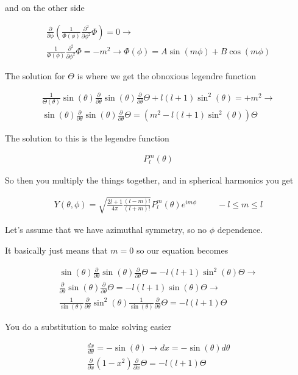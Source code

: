 \documentclass[fleqn]{report}
\newcommand{\hp}{\hspace{1cm}}
\newcommand{\del}{\partial}
\newcommand{\equations} [1] {
\begin{gather*}
#1
\end{gather*}
}
\begin{document}
and on the other side 

\equations{
    \frac{\del}{\del \phi}
    \left(
        \frac{1}{\Phi(\phi)}
        \frac{\del^2}{\del \phi^2}
        \Phi
    \right)
    = 
    0
    \rightarrow 
    \\
    \frac{1}{\Phi(\phi)}
    \frac{\del^2}{\del \phi^2}
    \Phi
    = 
    -m^2
    \rightarrow 
    \Phi(\phi)
    =
    A \sin(m \phi) + B \cos(m \phi)
}

The solution for $\Theta$ is where we get the obnoxious legendre function 

\equations{
    \frac{1}{\Theta(\theta)}
    \sin(\theta)
    \frac{\del}{\del \theta} 
    \sin(\theta) 
    \frac{\del}{\del \theta} 
    \Theta 
    +
    l(l+1) \sin^2(\theta)
    =
    +m^2
    \rightarrow 
    \\
    \sin(\theta)
    \frac{\del}{\del \theta} 
    \sin(\theta) 
    \frac{\del}{\del \theta} 
    \Theta 
    =
    \left(
    m^2
    -
    l(l+1) \sin^2(\theta)
    \right)
    \Theta 
}

The solution to this is the legendre function 

\equations{
    P^m_l(\theta)
}

So then you multiply the things together, and in spherical harmonics you get 
\equations{
    Y(\theta, \phi)
    =
    \sqrt{\frac{2l + 1}{4 \pi} \frac{(l - m)!}{(l + m)!}} 
    P^m_l(\theta) e^{i m \phi}
    \hp 
    -l \leq m \leq l
}

Let's assume that we have azimuthal symmetry, so no $\phi$ dependence. 

It basically just means that $m=0$ so our equation becomes 

\equations{
    \sin(\theta)
    \frac{\del}{\del \theta} 
    \sin(\theta) 
    \frac{\del}{\del \theta} 
    \Theta 
    =
    -
    l(l+1) \sin^2(\theta)
    \Theta 
    \rightarrow 
    \\
    \frac{\del}{\del \theta} 
    \sin(\theta) 
    \frac{\del}{\del \theta} 
    \Theta 
    =
    -
    l(l+1) \sin(\theta)
    \Theta 
    \rightarrow 
    \\
    \frac{1}{\sin(\theta)}
    \frac{\del}{\del \theta} 
    \sin^2(\theta) 
    \frac{1}{\sin(\theta)}
    \frac{\del}{\del \theta} 
    \Theta 
    =
    -
    l(l+1)
    \Theta 
}

You do a substitution to make solving easier 
\equations{
    \frac{dx}{d \theta} = - \sin(\theta)
    \rightarrow 
    dx = - \sin(\theta) d \theta
    \\
    \frac{\del}{\del x} 
    (1 - x^2)
    \frac{\del}{\del x} 
    \Theta 
    =
    -
    l(l+1)
    \Theta 
}
\end{document}
